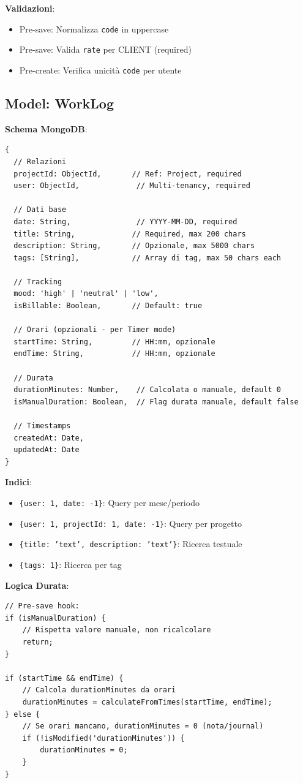 \documentclass[11pt,a4paper]{article}
\begin{document}
\textbf{Validazioni}:
\begin{itemize}
    \item Pre-save: Normalizza \texttt{code} in uppercase
    \item Pre-save: Valida \texttt{rate} per CLIENT (required)
    \item Pre-create: Verifica unicità \texttt{code} per utente
\end{itemize}

\subsection{Model: WorkLog}

\textbf{Schema MongoDB}:

\begin{lstlisting}
{
  // Relazioni
  projectId: ObjectId,       // Ref: Project, required
  user: ObjectId,             // Multi-tenancy, required
  
  // Dati base
  date: String,               // YYYY-MM-DD, required
  title: String,             // Required, max 200 chars
  description: String,       // Opzionale, max 5000 chars
  tags: [String],            // Array di tag, max 50 chars each
  
  // Tracking
  mood: 'high' | 'neutral' | 'low',
  isBillable: Boolean,       // Default: true
  
  // Orari (opzionali - per Timer mode)
  startTime: String,         // HH:mm, opzionale
  endTime: String,           // HH:mm, opzionale
  
  // Durata
  durationMinutes: Number,    // Calcolata o manuale, default 0
  isManualDuration: Boolean,  // Flag durata manuale, default false
  
  // Timestamps
  createdAt: Date,
  updatedAt: Date
}
\end{lstlisting}

\textbf{Indici}:
\begin{itemize}
    \item \texttt{\{user: 1, date: -1\}}: Query per mese/periodo
    \item \texttt{\{user: 1, projectId: 1, date: -1\}}: Query per progetto
    \item \texttt{\{title: 'text', description: 'text'\}}: Ricerca testuale
    \item \texttt{\{tags: 1\}}: Ricerca per tag
\end{itemize}

\textbf{Logica Durata}:
\begin{lstlisting}
// Pre-save hook:
if (isManualDuration) {
    // Rispetta valore manuale, non ricalcolare
    return;
}

if (startTime && endTime) {
    // Calcola durationMinutes da orari
    durationMinutes = calculateFromTimes(startTime, endTime);
} else {
    // Se orari mancano, durationMinutes = 0 (nota/journal)
    if (!isModified('durationMinutes')) {
        durationMinutes = 0;
    }
}
\end{lstlisting}
\end{document}
